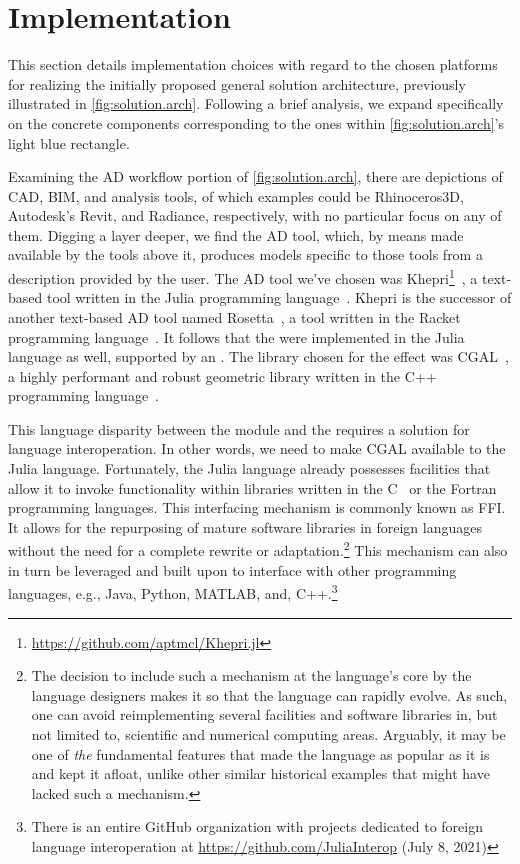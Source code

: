 \section{Implementation}%
\label{sec:solution.impl}

This section details implementation choices with regard to the chosen platforms
for realizing the initially proposed general solution architecture, previously
illustrated in \cref{fig:solution.arch}. Following a brief analysis, we expand
specifically on the concrete components corresponding to the ones within
\cref{fig:solution.arch}'s light blue rectangle.

Examining the \ac{AD} workflow portion of \cref{fig:solution.arch}, there are
depictions of \ac{CAD}, \ac{BIM}, and analysis tools, of which examples could be
Rhinoceros3D, Autodesk's Revit, and Radiance, respectively, with no particular
focus on any of them.  Digging a layer deeper, we find the \ac{AD} tool, which,
by means made available by the tools above it, produces models specific to those
tools from a description provided by the user.  The \ac{AD} tool we've chosen
was
Khepri\footnote{\url{https://github.com/aptmcl/Khepri.jl}}~\cite{Leitao:2019:GRUGEAV},
a text-based tool written in the Julia programming
language~\cite{Bezanson:2017:JAFANC}.  Khepri is the successor of another
text-based \ac{AD} tool named Rosetta~\cite{Leitao:2011:PGDCAD}, a tool written
in the Racket programming language~\cite{PLT:2010:Reference}.  It follows that
the \primitives{} were implemented in the Julia language as well, supported by
an \geomlibrary{}.  The library chosen for the effect was
\ac{CGAL}~\cite{CGAL:5.3:Project}, a highly performant and robust geometric
library written in the C++ programming language~\cite{Stroustrup:2013:CPP}.

This language disparity between the \primitives{} module and the \geomlibrary{}
requires a solution for language interoperation.  In other words, we need to
make \ac{CGAL} available to the Julia language.  Fortunately, the Julia language
already possesses facilities that allow it to invoke functionality within
libraries written in the C~\cite{Kernighan:1988:C} or the
Fortran~\cite{Backus:1957:Fortran} programming languages.  This interfacing
mechanism is commonly known as \ac{FFI}.  It allows for the repurposing of
mature software libraries in foreign languages without the need for a complete
rewrite or adaptation.\footnote{The decision to include such a mechanism at the
language's core by the language designers makes it so that the language can
rapidly evolve. As such, one can avoid reimplementing several facilities and
software libraries in, but not limited to, scientific and numerical computing
areas.  Arguably, it may be one of \textit{the} fundamental features that made
the language as popular as it is and kept it afloat, unlike other similar
historical examples that might have lacked such a mechanism.}  This mechanism
can also in turn be leveraged and built upon to interface with other programming
languages, e.g., Java, Python, MATLAB, and, C++.\footnote{There is an entire
GitHub organization with projects dedicated to foreign language interoperation
at \url{https://github.com/JuliaInterop} (July 8, 2021)}

